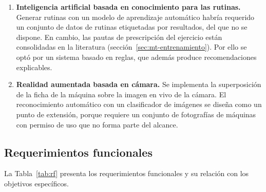 \begin{enumerate}
    \item \textbf{Inteligencia artificial basada en conocimiento para las
    rutinas.} Generar rutinas con un modelo de aprendizaje automático habría
    requerido un conjunto de datos de rutinas etiquetadas por resultados, del
    que no se dispone. En cambio, las pautas de prescripción del ejercicio
    están consolidadas en la literatura (sección~\ref{sec:mt-entrenamiento}).
    Por ello se optó por un sistema basado en reglas, que además produce
    recomendaciones explicables.
    \item \textbf{Realidad aumentada basada en cámara.} Se implementa la
    superposición de la ficha de la máquina sobre la imagen en vivo de la
    cámara. El reconocimiento automático con un clasificador de imágenes se
    diseña como un punto de extensión, porque requiere un conjunto de
    fotografías de máquinas con permiso de uso que no forma parte del
    alcance.
\end{enumerate}

\subsection{Requerimientos funcionales}

La Tabla~\ref{tab:rf} presenta los requerimientos funcionales y su relación
con los objetivos específicos.


